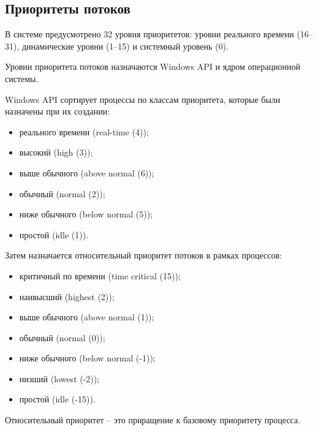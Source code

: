 \subsection{Приоритеты потоков}

В системе предусмотрено 32 уровня приоритетов: уровни реального времени (16--31), динамические уровни (1--15) и системный уровень (0). 

Уровни приоритета потоков назначаются {\ttfamily Windows API} и ядром операционной системы.

{\ttfamily Windows API} сортирует процессы по классам приоритета, которые были назначены при их создании:
\begin{itemize}
	\item реального времени (real-time (4));
	\item высокий (high (3));
	\item выше обычного (above normal (6));
	\item обычный (normal (2));
	\item ниже обычного (below normal (5));
	\item простой (idle (1)).
\end{itemize}

Затем назначается относительный приоритет потоков в рамках процессов:
\begin{itemize}
	\item критичный по времени (time critical (15));
	\item наивысший (highest (2));
	\item выше обычного (above normal (1));
	\item обычный (normal (0));
	\item ниже обычного (below normal (-1));
	\item низший (lowest (-2));
	\item простой (idle (-15)).
\end{itemize}

Относительный приоритет -- это приращение к базовому приоритету процесса.

